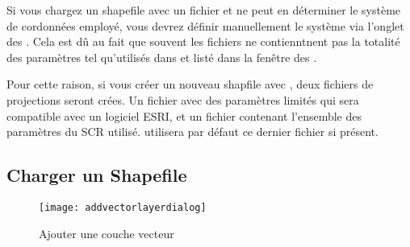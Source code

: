 

Si vous chargez un shapefile avec un fichier  et \qg ne peut en déterminer le système de cordonnées employé, vous devrez définir manuellement le système via l'onglet  des . Cela est dû au fait que souvent les fichiers  ne contienntnent pas la totalité des paramètres tel qu'utilisés dans \qg et listé dans la fenêtre des .

Pour cette raison, si vous créer un nouveau shapfile avec \qg, deux fichiers de projections seront crées. Un fichier  avec des paramètres limités qui sera compatible avec un logiciel ESRI, et un fichier  contenant l'ensemble des paramètres du SCR utilisé. \qg utilisera par défaut ce dernier fichier si présent.


\subsection{Charger un Shapefile}\label{sec:load_shapefile}

\begin{figure}[ht]
   \begin{center}  
   \texttt{[image: addvectorlayerdialog]}
   \caption{Ajouter une couche vecteur \nixcaption}\label{fig:addvectorlayer}
\end{center} 
\end{figure}

